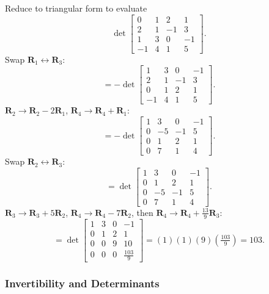 \begin{example}
  Reduce to triangular form to evaluate
  \[
    \det
    \begin{bmatrix}
      0  & 1 & 2  & 1  \\
      2  & 1 & -1 & 3  \\
      1  & 3 & 0  & -1 \\
      -1 & 4 & 1  & 5
    \end{bmatrix}
    .
  \]
  Swap $\mathbf{R}_1 \leftrightarrow \mathbf{R}_3$:
  \[
    = -\det
    \begin{bmatrix}
      1  & 3 & 0  & -1 \\
      2  & 1 & -1 & 3  \\
      0  & 1 & 2  & 1  \\
      -1 & 4 & 1  & 5
    \end{bmatrix}
    .
  \]
  $\mathbf{R}_2 \to \mathbf{R}_2 - 2\mathbf{R}_1$, $\mathbf{R}_4 \to \mathbf{R}_4 + \mathbf{R}_1$:
  \[
    = -\det
    \begin{bmatrix}
      1 & 3  & 0  & -1 \\
      0 & -5 & -1 & 5  \\
      0 & 1  & 2  & 1  \\
      0 & 7  & 1  & 4
    \end{bmatrix}
    .
  \]
  Swap $\mathbf{R}_2 \leftrightarrow \mathbf{R}_3$:
  \[
    = \det
    \begin{bmatrix}
      1 & 3  & 0  & -1 \\
      0 & 1  & 2  & 1  \\
      0 & -5 & -1 & 5  \\
      0 & 7  & 1  & 4
    \end{bmatrix}
    .
  \]
  $\mathbf{R}_3 \to \mathbf{R}_3 + 5\mathbf{R}_2$, $\mathbf{R}_4 \to \mathbf{R}_4 - 7\mathbf{R}_2$, then $\mathbf{R}_4 \to \mathbf{R}_4 + \tfrac{13}{9}\mathbf{R}_3$:
  \[
    = \det
    \begin{bmatrix}
      1 & 3 & 0 & -1             \\
      0 & 1 & 2 & 1              \\
      0 & 0 & 9 & 10             \\
      0 & 0 & 0 & \tfrac{103}{9}
    \end{bmatrix}
    = (1)(1)(9)\!\left(\tfrac{103}{9}\right) = 103.
  \]
\end{example}

\subsubsection{Invertibility and Determinants}


